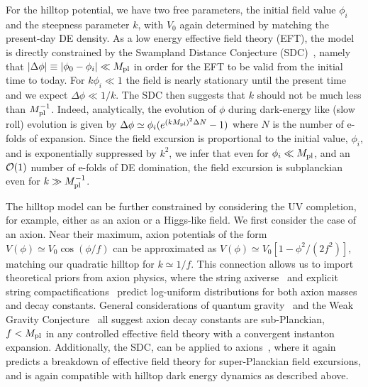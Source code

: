 For the hilltop potential, we have two free parameters, the initial field value $\phi_i$ and the steepness parameter $k$, with $V_0$ again determined by matching the present-day DE density. As a low energy effective field theory (EFT), the model is directly constrained by the Swampland Distance Conjecture (SDC)~\cite{Ooguri:2006in}, namely that $|\Delta \phi|\equiv |\phi_0 - \phi_i| \ll M_{\mathrm{pl}}$ in order for the EFT to be valid from the initial time to today. For $k \phi_i \ll 1$ the field is nearly stationary until the present time and we expect $\Delta \phi \ll 1/k$. The SDC then suggests that $k$ should not be much less than $M_{\mathrm{pl}}^{-1}$.
Indeed, analytically, the evolution of $\phi$ during dark-energy like (slow roll) evolution is given by $\Delta \phi \simeq \phi_i(e^{(k M_{\mathrm{pl}})^2 \Delta N}-1)$ where $N$ is the number of e-folds of expansion. Since the field excursion is proportional to the initial value, $\phi_i$, and is exponentially suppressed by $k^2$, we infer that even for $\phi_i \ll M_{\mathrm{pl}}$, and an ${\cal O}(1)$ number of e-folds of DE domination, the field excursion is subplanckian even for $k \gg M_{\mathrm{pl}}^{-1}$.


The hilltop model can be further constrained by considering the UV completion, for example, either as an axion or a Higgs-like field. We first consider the case of an axion. Near their maximum, axion potentials of the form $V(\phi) \simeq V_0\cos(\phi/f)$ can be approximated as $V(\phi) \simeq V_0\left[1 - \phi^2/(2f^2)\right]$, matching our quadratic hilltop for $k \simeq 1/f$. This connection allows us to import theoretical priors from axion physics, where the string axiverse~\cite{Arvanitaki:2009fg} and explicit string compactifications~\cite{Broeckel:2021dpz,Halverson:2019cmy,Mehta:2020kwu,Mehta:2021pwf,Demirtas:2021gsq} predict log-uniform distributions for both axion masses and decay constants. General considerations of quantum gravity~\cite{Montero:2015ofa,Kallosh:1995hi,Banks:2003sx} and the Weak Gravity Conjecture~\cite{Arkani-Hamed:2006emk, Harlow:2022ich} all suggest axion decay constants are sub-Planckian, $f<M_{\mathrm{pl}}$ in any controlled effective field theory with a convergent instanton expansion. Additionally, the SDC, can be applied to axions~\cite{Baume:2016psm,Klaewer:2016kiy,Blumenhagen:2017cxt,Scalisi:2018eaz}, where it again predicts a breakdown of effective field theory for super-Planckian field excursions, and is again compatible with hilltop dark energy dynamics as described above.

